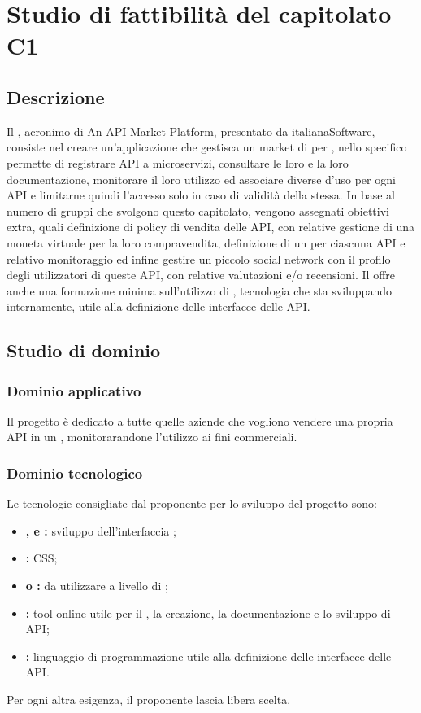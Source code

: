 \documentclass[../StudioDiFattibilita.tex]{subfiles}
\begin{document}
\section{Studio di fattibilità del capitolato C1}
	\subsection{Descrizione}
	Il  , acronimo di An API Market Platform, presentato da italianaSoftware, consiste nel creare un'applicazione  che gestisca un market di  per , nello specifico permette di registrare API a microservizi, consultare le loro  e la loro documentazione, monitorare il loro utilizzo ed associare diverse  d'uso per ogni API e limitarne quindi l'accesso solo in caso di validità della stessa. In base al numero di gruppi che svolgono questo capitolato, vengono assegnati obiettivi extra, quali definizione di policy di vendita delle API, con relative gestione di una moneta virtuale per la loro compravendita, definizione di un  per ciascuna API e relativo monitoraggio ed infine gestire un piccolo social network con il profilo degli utilizzatori di queste API, con relative valutazioni e/o recensioni. Il  offre anche una formazione minima sull'utilizzo di , tecnologia che sta sviluppando internamente, utile alla definizione delle interfacce delle API.

	\subsection{Studio di dominio}
	  	\subsubsection{Dominio applicativo}
		Il progetto è dedicato a tutte quelle aziende che vogliono vendere una propria API in un , monitorarandone l'utilizzo ai fini commerciali.

	 	\subsubsection{Dominio tecnologico}
		Le tecnologie consigliate dal proponente per lo sviluppo del progetto sono:
			\begin{itemize}
				\item \textbf{,  e :} sviluppo dell'interfaccia ;
				\item \textbf{:}  CSS;
				\item \textbf{ o  :} da utilizzare a livello di ;
				\item \textbf{:} tool online utile per il , la creazione, la documentazione e lo sviluppo di API;
				\item \textbf{:} linguaggio di programmazione utile alla definizione delle interfacce delle API.
			\end{itemize}
			Per ogni altra esigenza, il proponente lascia libera scelta.
\end{document}
